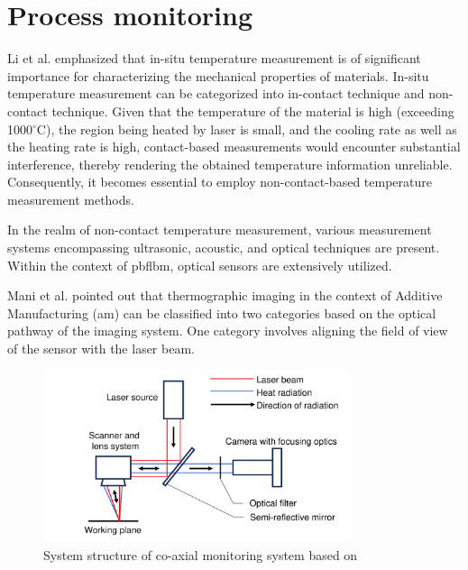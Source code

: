 \section{Process monitoring}%
Li et al. \cite{Li.2019} emphasized that in-situ temperature measurement is 
of significant importance for characterizing the mechanical properties of 
materials. In-situ temperature measurement can be categorized into 
in-contact technique and non-contact technique. Given that the temperature 
of the material is high (exceeding 1000$^\circ$C), the region being heated by laser 
is small, and the cooling rate as well as the heating rate is high, 
contact-based measurements would encounter substantial interference, 
thereby rendering the obtained temperature information unreliable. 
Consequently, it becomes essential to employ non-contact-based 
temperature measurement methods\cite{Qu.2020}.


In the realm of non-contact temperature measurement, 
various measurement systems encompassing ultrasonic, acoustic, and optical 
techniques are present. Within the context of \gls{pbflbm}, 
optical sensors are extensively utilized\cite{Krauss.2012}.


Mani et al. \cite{Mani.2017} pointed out that thermographic imaging in the 
context of Additive Manufacturing (\gls{am}) can be classified into two 
categories based on the optical pathway of the imaging system. 
One category involves aligning the field of view of the sensor with 
the laser beam\cite{Craeghs.2010b,Craeghs.2012,Chivel.2010,Bammer.2010,Berumen.2010,Lott.2011,Yadroitsev.2014}. 

\begin{figure}[htbp]
    \centering
    \includegraphics[width=0.8\textwidth]{figures/co-axial.pdf}
    \caption{System structure of co-axial monitoring system based on \cite{Craeghs.2010b}}
    \label{fig: co-axial}
\end{figure}

